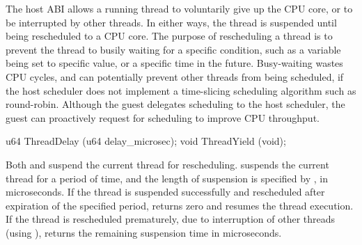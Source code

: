 The host ABI allows a running thread to voluntarily give up the CPU core,
or to be interrupted by other threads.
In either ways, the thread is suspended until being rescheduled
to a CPU core.
The purpose of rescheduling a thread is to prevent the thread to busily waiting for a specific condition,
such as a variable being set to specific value, or a specific time in the future.
Busy-waiting wastes CPU cycles,
and can potentially prevent other threads from being scheduled, if the host scheduler does not
implement a time-slicing scheduling algorithm such as round-robin.
Although the guest delegates scheduling to the host scheduler, the guest can proactively request for scheduling to improve CPU throughput.






\begin{paldef}
u64  ThreadDelay     (u64 delay_microsec);
void ThreadYield     (void);
\end{paldef}


Both  and  suspend the current thread for rescheduling.
 suspends the current thread
for a period of time, and the length of suspension is specified by , in microseconds.
If the thread is suspended successfully and rescheduled after expiration of the specified period,
 returns zero and resumes the thread execution.
If the thread is rescheduled prematurely, due to interruption of other threads (using ),
 returns the remaining suspension time in microseconds.


